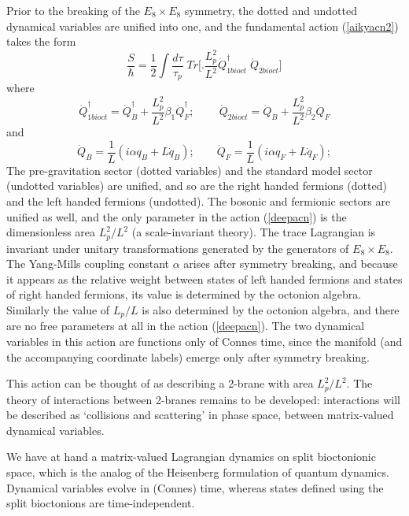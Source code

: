 \documentclass[a4paper]{jpconf}
\begin{document}
Prior to the breaking of the $E_8 \times E_8$ symmetry, the dotted and undotted dynamical variables are unified into one, and the fundamental action (\ref{aikyacn2}) takes the form
\begin{equation}
\frac{S}{\hbar} = \frac{1}{2}\int \frac{d\tau}{\tau_{p}}\; Tr \biggl[\biggr. \dfrac{L_{p}^{2}}{L^{2}}  \dot{Q}_{1bioct}^\dagger\;  \dot {Q}_{2bioct} \biggr]
\label{deepacn}
\end{equation}
where
\begin{equation}
\dot{{Q}}_{1bioct} ^\dagger   =   \dot{{Q}}_{B}^\dagger + \dfrac{L_{p}^{2}}{L^{2}} \beta_{1} \dot{{Q}}_{F}^\dagger  ; \ \qquad \dot {{Q}}_{2bioct} =  \dot{{Q}}_{B} + \dfrac{L_{p}^{2}}{L^{2}} \beta_{2} \dot{{Q}}_{F}
\end{equation}
and
\begin{equation}
{\dot{{Q}}_B} = \frac{1}{L} (i\alpha q_B + L \dot{q}_B); \qquad  {\dot{{Q}}_F} = \frac{1}{L} (i\alpha q_F + L \dot{q}_F);
\end{equation}
The pre-gravitation sector (dotted variables) and the standard model sector (undotted variables) are unified, and so are the right handed fermions (dotted) and the left handed fermions (undotted). The bosonic and fermionic sectors are unified as well, and the only parameter in the action (\ref{deepacn}) is the dimensionless area $L_p^2/L^2$ (a scale-invariant theory). The trace Lagrangian is invariant under unitary transformations generated by the generators of $E_8 \times E_8$. The Yang-Mills coupling constant $\alpha$ arises after symmetry breaking, and because it appears as the relative weight between states of left handed fermions and states of right handed fermions, its value is determined by the octonion algebra. Similarly the value of $L_p/L$ is also determined by the octonion algebra, and there are no free parameters at all in the action (\ref{deepacn}).  The two dynamical variables in this action are functions only of Connes time, since the manifold (and the accompanying coordinate labels) emerge only after symmetry breaking.

This action can be thought of as describing a 2-brane with area $L_p^2 / L^2$.  The theory of interactions between 2-branes remains to be developed: interactions will be described as `collisions and scattering' in phase space, between matrix-valued dynamical variables.

We have at hand a matrix-valued Lagrangian dynamics on split bioctonionic space, which is the analog of the Heisenberg formulation of quantum dynamics. Dynamical variables evolve in (Connes) time, whereas states defined using the split bioctonions are time-independent.
\end{document}
